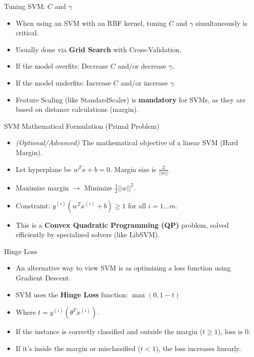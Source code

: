 \documentclass[aspectratio=169]{beamer}
\begin{document}
\begin{frame}{Tuning SVM: $C$ and $\gamma$}
\begin{itemize}
    \item When using an SVM with an RBF kernel, tuning $C$ and $\gamma$ simultaneously is critical.
    \item Usually done via \textbf{Grid Search} with Cross-Validation.
    \item If the model overfits: Decrease $C$ and/or decrease $\gamma$.
    \item If the model underfits: Increase $C$ and/or increase $\gamma$.
    \item Feature Scaling (like StandardScaler) is \textbf{mandatory} for SVMs, as they are based on distance calculations (margin).
\end{itemize}
\end{frame}

\begin{frame}{SVM Mathematical Formulation (Primal Problem)}
\begin{itemize}
    \item \textit{(Optional/Advanced)} The mathematical objective of a linear SVM (Hard Margin).
    \item Let hyperplane be $w^T x + b = 0$. Margin size is $\frac{2}{||w||}$.
    \item Maximize margin $\rightarrow$ Minimize $\frac{1}{2} ||w||^2$.
    \item Constraint: $y^{(i)}(w^T x^{(i)} + b) \ge 1$ for all $i=1 \dots m$.
    \item This is a \textbf{Convex Quadratic Programming (QP)} problem, solved efficiently by specialized solvers (like LibSVM).
\end{itemize}
\end{frame}

\begin{frame}{Hinge Loss}
\begin{itemize}
    \item An alternative way to view SVM is as optimizing a loss function using Gradient Descent.
    \item SVM uses the \textbf{Hinge Loss} function: $\max(0, 1 - t)$
    \item Where $t = y^{(i)}(\theta^T x^{(i)})$.
    \item If the instance is correctly classified and outside the margin ($t \ge 1$), loss is 0.
    \item If it's inside the margin or misclassified ($t < 1$), the loss increases linearly.
\end{itemize}
\end{frame}
\end{document}
